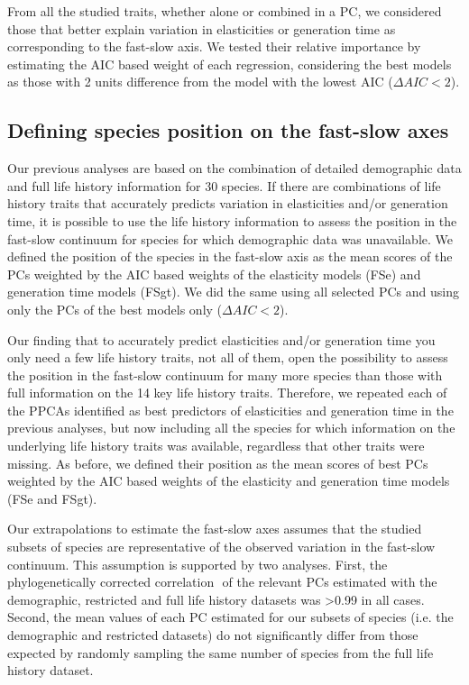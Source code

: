 From all the studied traits, whether alone or combined in a PC, we considered
those that better explain variation in elasticities or generation time as
corresponding to the fast-slow axis. We tested their relative importance by
estimating the AIC based weight of each regression, considering the best models
as those with 2 units difference from the model with the lowest AIC
($\Delta AIC < 2$).


\subsection*{Defining species position on the fast-slow axes}

Our previous analyses are based on the combination of detailed demographic data 
and full life history information for 30 species. If there are combinations of 
life history traits that accurately predicts variation in elasticities and/or 
generation time, it is possible to use the life history information to assess 
the position in the fast-slow continuum for species for which demographic data 
was unavailable. We defined the position of the species in the fast-slow axis 
as the mean scores of the PCs weighted by the AIC based weights of the
elasticity models (FSe) and generation time models (FSgt). We did the same using
all selected PCs and using only the PCs of the best models only
($\Delta AIC < 2$).

Our finding that to accurately predict elasticities and/or generation time you 
only need a few life history traits, not all of them, open the possibility to 
assess the position in the fast-slow continuum for many more species than those 
with full information on the 14 key life history traits. Therefore, we repeated 
each of the PPCAs identified as best predictors of elasticities and generation 
time in the previous analyses, but now including all the species for which 
information on the underlying life history traits was available, regardless that 
other traits were missing. As before, we defined their position as the mean 
scores of best PCs weighted by the AIC based weights of the elasticity 
and generation time models (FSe and FSgt).

Our extrapolations to estimate the fast-slow axes assumes that the studied
subsets of species are representative of the observed variation in the fast-slow
continuum.
This assumption is supported by two analyses. First, the phylogenetically 
corrected correlation \citep{Revell2009a}⁠ of the relevant PCs estimated with
the demographic, restricted and full life history datasets was
\textgreater{0.99} in all cases.
Second, the mean values of each PC estimated for our subsets of species (i.e.
the demographic and restricted datasets) do not significantly differ from those
expected by randomly sampling the same number of species from the full life
history dataset.


